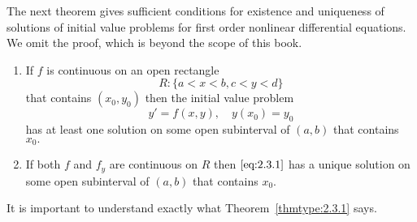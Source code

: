 \documentclass{ximera}
\begin{document}
The next theorem gives sufficient conditions for existence and
uniqueness of solutions of initial value problems for first order
nonlinear differential equations. We omit the proof, which is beyond
the scope of this book.

\begin{theorem}\label{thmtype:2.3.1} 
\begin{enumerate}
\item\label{thmtype:2.3.1a}
 If  $f$ is continuous
on an open rectangle
$$
R:  \{ a < x < b, c < y < d \}
$$
 that contains $(x_0,y_0)$
then  the initial value problem
\begin{equation} \label{eq:2.3.1}
y'=f(x,y), \quad y(x_0)=y_0
\end{equation}
 has at least one solution  on some open subinterval
of  $(a,b)$ that contains $x_0.$

\item\label{thmtype:2.3.1b}
 If  both $f$ and  $f_y$ are
 continuous on $R$ then $\eqref{eq:2.3.1}$ has a unique
solution on some open subinterval  of $(a,b)$ that contains $x_0$.
\end{enumerate}
\end{theorem}


It is important to understand exactly what Theorem~\ref{thmtype:2.3.1}
says.
\end{document}
